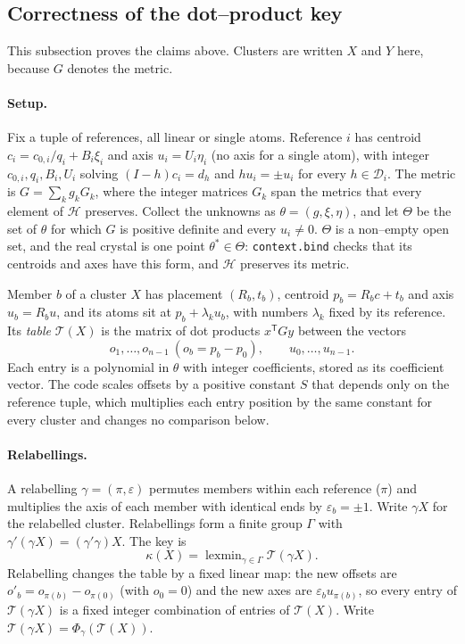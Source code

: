 \documentclass[11pt]{article}
\theoremstyle{definition}
\newcommand{\Hgrp}{\mathcal{H}}
\newcommand{\Dgrp}{\mathcal{D}}
\newcommand{\lexmin}{\operatorname{lexmin}}
\begin{document}
\subsection{Correctness of the dot--product key}\label{sec:linear-proof}

This subsection proves the claims above. Clusters are written $X$ and $Y$ here,
because $G$ denotes the metric.

\paragraph{Setup.} Fix a tuple of references, all linear or single atoms.
Reference $i$ has centroid $c_i=c_{0,i}/q_i+B_i\xi_i$ and axis $u_i=U_i\eta_i$
(no axis for a single atom), with integer $c_{0,i},q_i,B_i,U_i$ solving
$(I-h)c_i=d_h$ and $hu_i=\pm u_i$ for every $h\in\Dgrp_i$. The metric is
$G=\sum_kg_kG_k$, where the integer matrices $G_k$ span the metrics that every
element of $\Hgrp$ preserves. Collect the unknowns as
$\theta=(g,\xi,\eta)$, and let $\Theta$ be the set of $\theta$ for which $G$
is positive definite and every $u_i\neq0$. $\Theta$ is a non--empty open set,
and the real crystal is one point $\theta^\ast\in\Theta$:
\texttt{context.bind} checks that its centroids and axes have this form, and
$\Hgrp$ preserves its metric.

Member $b$ of a cluster $X$ has placement $(R_b,t_b)$, centroid
$p_b=R_bc+t_b$ and axis $u_b=R_bu$, and its atoms sit at $p_b+\lambda_ku_b$,
with numbers $\lambda_k$ fixed by its reference. Its \emph{table}
$\mathcal T(X)$ is the matrix of dot products $x^{\mathsf T}Gy$ between the
vectors
\begin{equation}\label{eq:linvectors}
  o_1,\dots,o_{n-1}\ (o_b=p_b-p_0),\qquad u_0,\dots,u_{n-1}.
\end{equation}
Each entry is a polynomial in $\theta$ with integer coefficients, stored as its
coefficient vector. The code scales offsets by a positive constant $S$ that
depends only on the reference tuple, which multiplies each entry position by
the same constant for every cluster and changes no comparison below.

\paragraph{Relabellings.} A relabelling $\gamma=(\pi,\varepsilon)$ permutes
members within each reference ($\pi$) and multiplies the axis of each member
with identical ends by $\varepsilon_b=\pm1$. Write $\gamma X$ for the
relabelled cluster. Relabellings form a finite group $\Gamma$ with
$\gamma'(\gamma X)=(\gamma'\gamma)X$. The key is
\[
  \kappa(X)=\lexmin_{\gamma\in\Gamma}\mathcal T(\gamma X).
\]
Relabelling changes the table by a fixed linear map: the new offsets are
$o'_b=o_{\pi(b)}-o_{\pi(0)}$ (with $o_0=0$) and the new axes are
$\varepsilon_bu_{\pi(b)}$, so every entry of $\mathcal T(\gamma X)$ is a fixed
integer combination of entries of $\mathcal T(X)$. Write
$\mathcal T(\gamma X)=\Phi_\gamma(\mathcal T(X))$.
\end{document}
